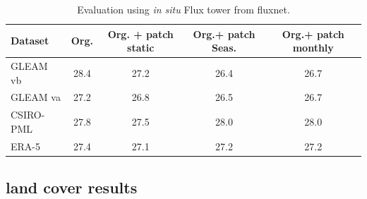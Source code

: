 \documentclass[draft]{agujournal2019}
\begin{document}
\begin{table}[h]
\centering
\begin{scriptsize}
\begin{tabular} {l c c c c}
\hline
Dataset & Org. &   Org. + patch static &  Org.+ patch Seas. &  Org.+ patch monthly \\
\hline 
GLEAM vb &   28.4 &  27.2  & 26.4  & 26.7\\
 GLEAM va &  27.2  & 26.8 &  26.5  & 26.7\\
  CSIRO-PML &  27.8  & 27.5  & 28.0  & 28.0\\
  ERA-5 & 27.4  & 27.1  & 27.2  & 27.2\\
\hline 
\end{tabular}
\end{scriptsize}
\caption{Evaluation using {\it in situ} Flux tower from fluxnet.}
\label{table1}
\end{table}


\subsection{land cover results}
\end{document}
